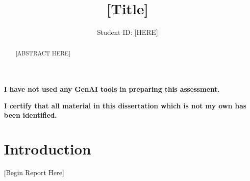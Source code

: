 \documentclass[a4paper,11pt]{article}
\title{[Title]}
\author{Student ID: [HERE]}
\begin{document}
\maketitle

\begin{abstract}
    [ABSTRACT HERE]
\end{abstract}

\vspace*{\fill}

\begin{checkbox}
    \item {\bf I have not used any GenAI tools in preparing this assessment.}
    \item {\bf I certify that all material in this dissertation which is not my own has been identified.}
\end{checkbox}

\newpage


\tableofcontents

\newpage


\section{Introduction}

[Begin Report Here]



\end{document}
